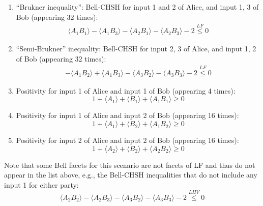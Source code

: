\documentclass[aps,prx,twocolumn,superscriptaddress]{revtex4-1}
\theoremstyle{plain}
\newcommand{\eg}{e.g.}
\begin{document}
\begin{enumerate}
\begin{equation}
\begin{split}
	- \langle A_1B_2 \rangle  + \langle A_1B_3 \rangle - \langle A_2B_1 \rangle - \langle A_2B_2 \rangle\\
	 - \langle A_2B_3 \rangle + \langle A_3B_1 \rangle 	- \langle A_3B_2 \rangle - \langle A_3B_3 \rangle -4 \overset{LF}{\le} 0
	\end{split}
	\end{equation}     
\item ``Brukner inequality'': Bell-CHSH for input 1 and 2 of Alice, and input 1, 3 of Bob (appearing 32 times):	
	\begin{equation} \label{eq:Brukner}
	\begin{split}
\langle{A_1B_1}\rangle-\langle{A_1B_3}\rangle-\langle{A_2B_1}\rangle-\langle{A_2B_3}\rangle-2\overset{LF}{\le} 0
 	\end{split}
	\end{equation}     
\item ``Semi-Brukner'' inequality: Bell-CHSH for input 2, 3 of Alice, and input 1, 2 of Bob (appearing 32 times):
	\begin{equation}\label{eq:half-Brukner}
	\begin{split}
-\langle{A_1B_2}\rangle+\langle{A_1B_3}\rangle-\langle{A_3B_2}\rangle-\langle{A_3B_3}\rangle-2 \overset{LF}{\le} 0
	\end{split}
	\end{equation} 
\item Positivity for input 1 of Alice and input 1 of Bob (appearing 4 times):		    
	\begin{equation}
     1+\langle A_1 \rangle+\langle B_1 \rangle+\langle A_1B_1 \rangle \ge 0
	\end{equation} 
\item Positivity for input 1 of Alice and input 2 of Bob (appearing 16 times):
	\begin{equation}
     1+\langle A_1 \rangle+\langle B_2 \rangle+\langle A_1B_2 \rangle \ge 0
	\end{equation} 
\item Positivity for input 2 of Alice and input 2 of Bob (appearing 16 times):		    	
	\begin{equation}
     1+\langle A_2 \rangle+\langle B_2 \rangle+\langle A_2B_2 \rangle \ge 0
	\end{equation} 
\end{enumerate}

Note that some Bell facets for this scenario are not facets of LF and thus do not appear in the list above, \eg, the Bell-CHSH inequalities that do not include any input 1 for either party:
\begin{equation}
\label{eq:Bell-non-LF}
\langle{A_2B_2}\rangle-\langle{A_2B_3}\rangle-\langle{A_3B_2}\rangle-\langle{A_3B_3}\rangle-2 \overset{LHV}{\le} 0
\end{equation}
\end{document}
